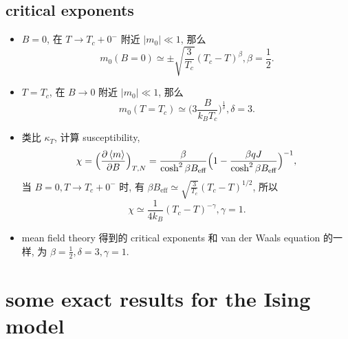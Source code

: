 \subsection{critical exponents}
\begin{itemize}
	\item $B = 0$, 在 $T \rightarrow T_c + 0^-$ 附近 $|m_0| \ll 1$, 那么
	\begin{equation}
		m_0(B = 0) \simeq \pm \sqrt{\frac{3}{T_c}} (T_c - T)^\beta, \beta = \frac{1}{2}.
	\end{equation}
	
	\item $T = T_c$, 在 $B \rightarrow 0$ 附近 $|m_0| \ll 1$, 那么
	\begin{equation}
		m_0(T = T_c) \simeq \Big( 3 \frac{B}{k_B T_c} \Big)^{\frac{1}{\delta}}, \delta = 3.
	\end{equation}
	
	\item 类比 $\kappa_T$, 计算 susceptibility,
	\begin{equation}
		\chi = \Big( \frac{\partial \braket{m}}{\partial B} \Big)_{T, N} = \frac{\beta}{\cosh^2 \beta B_\text{eff}} \Big( 1 - \frac{\beta q J}{\cosh^2 \beta B_\text{eff}} \Big)^{- 1},
	\end{equation}
	当 $B = 0, T \rightarrow T_c + 0^-$ 时, 有 $\beta B_\text{eff} \simeq \sqrt{\frac{3}{T_c}} (T_c - T)^{1 / 2}$, 所以
	\begin{equation}
		\chi \simeq \frac{1}{4 k_B} (T_c - T)^{- \gamma}, \gamma = 1.
	\end{equation}
	
	\item mean field theory 得到的 critical exponents 和 van der Waals equation 的一样, 为 $\beta = \frac{1}{2}, \delta = 3, \gamma = 1$.
\end{itemize}

\section{some exact results for the Ising model}
